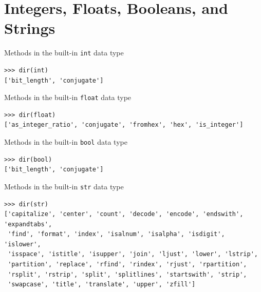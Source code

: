 \documentclass[8pt,a4paper,compress]{beamer}
\begin{document}
\section{Integers, Floats, Booleans, and Strings}
\begin{frame}[fragile]
\pause

Methods in the built-in \lstinline{int} data type
\begin{lstlisting}[language={}]
>>> dir(int) 
['bit_length', 'conjugate']
\end{lstlisting}

\pause
\bigskip

Methods in the built-in \lstinline{float} data type
\begin{lstlisting}[language={}]
>>> dir(float) 
['as_integer_ratio', 'conjugate', 'fromhex', 'hex', 'is_integer']
\end{lstlisting}

\pause
\bigskip

Methods in the built-in \lstinline{bool} data type
\begin{lstlisting}[language={}]
>>> dir(bool) 
['bit_length', 'conjugate']
\end{lstlisting}

\pause
\bigskip

Methods in the built-in \lstinline{str} data type
\begin{lstlisting}[language={}]
>>> dir(str)
['capitalize', 'center', 'count', 'decode', 'encode', 'endswith', 'expandtabs', 
 'find', 'format', 'index', 'isalnum', 'isalpha', 'isdigit', 'islower', 
 'isspace', 'istitle', 'isupper', 'join', 'ljust', 'lower', 'lstrip', 
 'partition', 'replace', 'rfind', 'rindex', 'rjust', 'rpartition', 
 'rsplit', 'rstrip', 'split', 'splitlines', 'startswith', 'strip', 
 'swapcase', 'title', 'translate', 'upper', 'zfill']
\end{lstlisting}
\end{frame}
\end{document}
